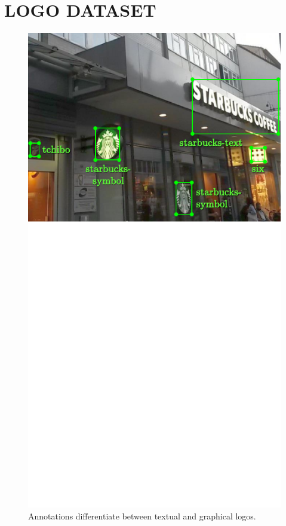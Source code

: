 \documentclass[a4paper,twoside]{article}
\begin{document}
\section{\uppercase{Logo Dataset}}
%
\begin{figure}%
\centering%
\includegraphics[width=\linewidth, trim=0cm 9cm 0cm 0cm, clip]{img/annotatedSample.pdf}%
\caption{Annotations differentiate between textual and graphical logos.}%
\label{fig:annotatedSample}
\end{figure}%
\end{document}
